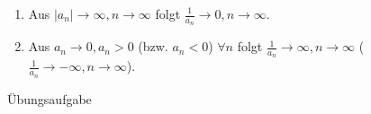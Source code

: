 \documentclass[../ana1.tex]{subfiles}
\begin{document}
\begin{satz}[Kehrwerte]
	\begin{enumerate}
		\item Aus \( |a_n| \rightarrow \infty, n\rightarrow\infty \) folgt \(\frac{1}{a_n} \rightarrow0,n\rightarrow\infty \).
		\item Aus \( a_n\rightarrow 0, a_n > 0 \) (bzw. \(a_n<0\)) \( \forall n \) folgt \( \frac{1}{a_n} \rightarrow\infty, n\rightarrow\infty \) (\( \frac{1}{a_n} \rightarrow -\infty, n\rightarrow\infty \)).
	\end{enumerate}
\end{satz}
\begin{bew}
	Übungsaufgabe
\end{bew}
\end{document}
